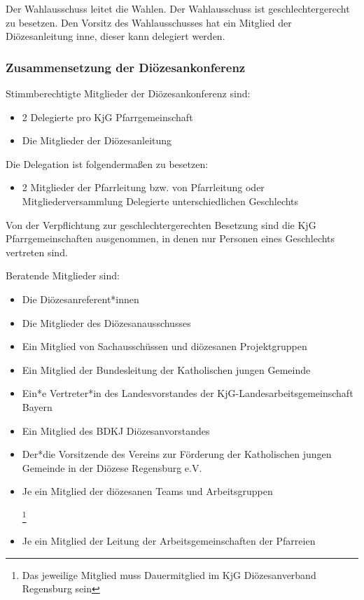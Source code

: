 \documentclass[12pt]{report}
\newcommand{\footnoteremember}[2]{
  \footnote{#2}
  \newcounter{#1}
  \setcounter{#1}{\value{footnote}}
}
\newcommand{\footnoterecall}[1]{%
  \footnotemark[\value{#1}]
}
\begin{document}
\begin{flushleft}
Der Wahlausschuss leitet die Wahlen. Der Wahlausschuss ist geschlechtergerecht zu besetzen. Den Vorsitz
des Wahlausschusses hat ein Mitglied der Diözesanleitung inne, dieser kann delegiert werden.

\subsubsection{Zusammensetzung der Diözesankonferenz}
Stimmberechtigte Mitglieder der Diözesankonferenz sind:
\begin{itemize}
  \item 2 Delegierte pro KjG Pfarrgemeinschaft
  \item Die Mitglieder der Diözesanleitung
\end{itemize}

Die Delegation ist folgendermaßen zu besetzen:
\begin{itemize}
  \item{ 2 Mitglieder der Pfarrleitung bzw. von Pfarrleitung oder Mitgliederversammlung
        Delegierte unterschiedlichen Geschlechts}
\end{itemize}

Von der Verpflichtung zur geschlechtergerechten Besetzung sind die KjG Pfarrgemeinschaften ausgenommen,
in denen nur Personen eines Geschlechts vertreten sind.

Beratende Mitglieder sind:
\begin{itemize}
  \item Die Diözesanreferent*innen
  \item Die Mitglieder des Diözesanausschusses
  \item Ein Mitglied von Sachausschüssen und diözesanen Projektgruppen
  \item Ein Mitglied der Bundesleitung der Katholischen jungen Gemeinde
  \item Ein*e Vertreter*in des Landesvorstandes der KjG-Landesarbeitsgemeinschaft Bayern
  \item Ein Mitglied des BDKJ Diözesanvorstandes
  \item Der*die Vorsitzende des Vereins zur Förderung der Katholischen jungen Gemeinde in der
        Diözese Regensburg e.V.
  \item Je ein Mitglied der diözesanen Teams und Arbeitsgruppen
        \footnoteremember{Dauermitglied}{Das jeweilige Mitglied muss Dauermitglied im KjG Diözesanverband Regensburg sein}
  \item Je ein Mitglied der Leitung der Arbeitsgemeinschaften der Pfarreien \footnoterecall{Dauermitglied}
\end{itemize}


\end{flushleft}
\end{document}
